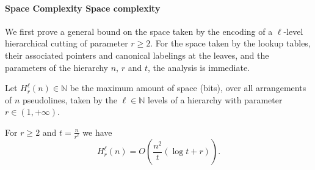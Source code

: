 \paragraph*{\iftitlecase%
Space Complexity\else%
Space complexity\fi}
We first prove a general bound on the space taken by the encoding of a
\(\ell\)-level hierarchical cutting of parameter \(r \geq 2\).
For the space taken by the lookup tables, their associated pointers and canonical
labelings at the leaves, and the parameters of the hierarchy \(n\), \(r\) and
\(t\), the analysis is immediate.

Let \(H_r^\ell(n) \in \mathbb{N}\) be the maximum amount of space (bits), over
all arrangements of \(n\) pseudolines, taken by the \(\ell \in \mathbb{N}\)
levels of a hierarchy with parameter \(r \in (1,+\infty)\).

\begin{lemma}\label{lem:space-2-hierarchy}
For \( r \geq 2 \) and \( t = \frac{n}{r^\ell}\) we have
\begin{displaymath}
H_r^\ell(n)
=
O\left(\frac{n^2}{t} ( \log t + r )\right).
\end{displaymath}
\end{lemma}

